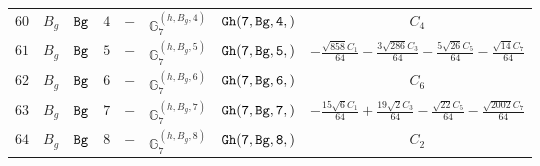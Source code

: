 \documentclass[fleqn,8pt]{jsarticle}
\begin{document}
\begin{table}[ht!]
\begin{center}
\begin{tabular}{cccccccc}
$ 60 $ & $ B_{g} $ & $ {\tt Bg} $ & $ 4 $ & $ - $ & $ \mathbb{G}_{7}^{(h,B_{g},4)} $ & $ {\tt Gh(7,Bg,4,)} $ & $ C_{4} $ \\
$ 61 $ & $ B_{g} $ & $ {\tt Bg} $ & $ 5 $ & $ - $ & $ \mathbb{G}_{7}^{(h,B_{g},5)} $ & $ {\tt Gh(7,Bg,5,)} $ & $ - \frac{\sqrt{858} C_{1}}{64} - \frac{3 \sqrt{286} C_{3}}{64} - \frac{5 \sqrt{26} C_{5}}{64} - \frac{\sqrt{14} C_{7}}{64} $ \\
$ 62 $ & $ B_{g} $ & $ {\tt Bg} $ & $ 6 $ & $ - $ & $ \mathbb{G}_{7}^{(h,B_{g},6)} $ & $ {\tt Gh(7,Bg,6,)} $ & $ C_{6} $ \\
$ 63 $ & $ B_{g} $ & $ {\tt Bg} $ & $ 7 $ & $ - $ & $ \mathbb{G}_{7}^{(h,B_{g},7)} $ & $ {\tt Gh(7,Bg,7,)} $ & $ - \frac{15 \sqrt{6} C_{1}}{64} + \frac{19 \sqrt{2} C_{3}}{64} - \frac{\sqrt{22} C_{5}}{64} - \frac{\sqrt{2002} C_{7}}{64} $ \\
$ 64 $ & $ B_{g} $ & $ {\tt Bg} $ & $ 8 $ & $ - $ & $ \mathbb{G}_{7}^{(h,B_{g},8)} $ & $ {\tt Gh(7,Bg,8,)} $ & $ C_{2} $ \\
 \hline \hline
\end{tabular}
\end{center}
\end{table}
\end{document}
